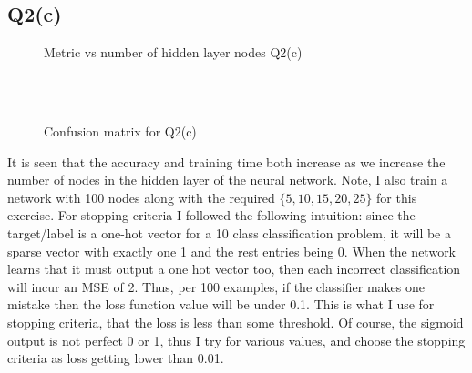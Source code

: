 \documentclass[11pt]{article}
\begin{document}
\subsection{Q2(c)}
\label{sec-2-3}
\begin{figure}[!ht]
	\caption{Metric vs number of hidden layer nodes Q2(c)}
\end{figure}
\begin{figure}[!ht]
	\\
	\\
	\caption{Confusion matrix for Q2(c)}
\end{figure}
It is seen that the accuracy and training time both increase as we
increase the number of nodes in the hidden layer of the neural
network. Note, I also train a network with 100 nodes along with the
required \(\{5,10,15,20,25\}\) for this exercise.
For stopping criteria I followed the following intuition: since the
target/label is a one-hot vector for a 10 class classification
problem, it will be a sparse vector with exactly one 1 and the rest
entries being 0. When the network learns that it must output a one hot
vector too, then each incorrect classification will incur an MSE
of 2. Thus, per 100 examples, if the classifier makes one mistake then
the loss function value will be under 0.1. This is what I use for
stopping criteria, that the loss is less than some threshold. Of
course, the sigmoid output is not perfect 0 or 1, thus I try for
various values, and choose the stopping criteria as loss getting lower
than 0.01.
\clearpage
\end{document}
